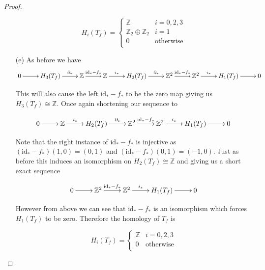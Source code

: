 \documentclass[10pt]{article}
\newcommand{\sk}{\vskip 10mm}
\newcommand{\bb}[1]{\mathbb{#1}}
\newcommand{\id}{\mathrm{id}}
\theoremstyle{plain}
\theoremstyle{remark}
\begin{document}
\begin{proof}
\begin{enumerate}
    \[
      H_i(T_f) =
      \left\{
        \begin{array}{cr}
          \bb{Z} & i=0,2,3\\
          \bb{Z}_2\oplus\bb{Z}_2 & i=1\\
          0 & \text{otherwise}\\
        \end{array}
      \right.
    \]
  \item[(e)]
    As before we have
    \[
      \xymatrix{
        0 \ar[r] & H_3(T_f) \ar[r]^-{\partial_*} & \bb{Z} \ar[r]^-{\id_*-f_*} & \bb{Z} \ar[r]^-{i_*} & H_2(T_f) \ar[r]^-{\partial_*} & \bb{Z}^2 \ar[r]^-{\id_*-f_*} & \bb{Z}^2 \ar[r]^-{i_*} & H_1(T_f) \ar[r] & 0
      }
    \]

    This will also cause the left $\id_*-f_*$ to be the zero map giving us
    $H_3(T_f)\cong\bb{Z}$. Once again shortening our sequence to

    \[
      \xymatrix{
        0 \ar[r] & \bb{Z} \ar[r]^-{i_*} & H_2(T_f) \ar[r]^-{\partial_*} & \bb{Z}^2 \ar[r]^-{\id_*-f_*} & \bb{Z}^2 \ar[r]^-{i_*} & H_1(T_f) \ar[r] & 0
      }
    \]

    Note that the right instance of $\id_*-f_*$ is injective
    as $(\id_*-f_*)(1,0)=(0,1)$ and $(\id_*-f_*)(0,1)=(-1,0)$. Just as
    before this induces an isomorphism on $H_2(T_f)\cong \bb{Z}$ and giving
    us a short exact sequence

    \[
      \xymatrix{
        0 \ar[r] &\bb{Z}^2 \ar[r]^-{\id_*-f_*} & \bb{Z}^2 \ar[r]^-{i_*} & H_1(T_f) \ar[r] & 0
      }
    \]

    However from above we can see that $\id_*-f_*$ is an isomorphism which
    forces $H_1(T_f)$ to be zero. Therefore the homology of $T_f$ is
    
    \[
      H_i(T_f) =
      \left\{
        \begin{array}{cr}
          \bb{Z} & i=0,2,3\\
          0 & \text{otherwise}\\
        \end{array}
      \right.
    \]
  \end{enumerate}
\end{proof}

\sk

\end{document}
